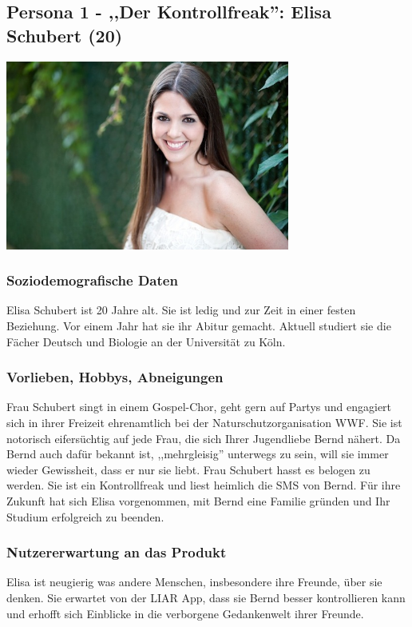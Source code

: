 \documentclass[10pt, a4paper, oneside, titlepage]{scrartcl} %
\begin{document}
	\subsection{Persona 1 - ,,Der Kontrollfreak'': Elisa Schubert (20)}
	\begin{center}
		\includegraphics[width=0.7\textwidth]{persona_01.jpg}
	\end{center}
	\subsubsection{Soziodemografische Daten}
	Elisa Schubert ist 20 Jahre alt. Sie ist ledig und zur Zeit in einer festen Beziehung. Vor einem Jahr hat sie ihr Abitur gemacht. Aktuell studiert sie die Fächer Deutsch und Biologie an der Universität zu Köln.
	\subsubsection{Vorlieben, Hobbys, Abneigungen}
	Frau Schubert singt in einem Gospel-Chor, geht gern auf Partys und engagiert sich in ihrer Freizeit ehrenamtlich bei der Naturschutzorganisation WWF. Sie ist notorisch eifersüchtig auf jede Frau, die sich Ihrer Jugendliebe Bernd nähert. Da Bernd auch dafür bekannt ist, ,,mehrgleisig'' unterwegs zu sein, will sie immer wieder Gewissheit, dass er nur sie liebt. Frau Schubert hasst es belogen zu werden. Sie ist ein Kontrollfreak und liest heimlich die SMS von Bernd. Für ihre Zukunft hat sich Elisa vorgenommen, mit Bernd eine Familie gründen und Ihr Studium erfolgreich zu beenden. 
	\subsubsection{Nutzererwartung an das Produkt}
	Elisa ist neugierig was andere Menschen, insbesondere ihre Freunde, über sie denken. Sie erwartet von der LIAR App, dass sie Bernd besser kontrollieren kann und erhofft sich Einblicke in die verborgene Gedankenwelt ihrer Freunde.
\end{document}
